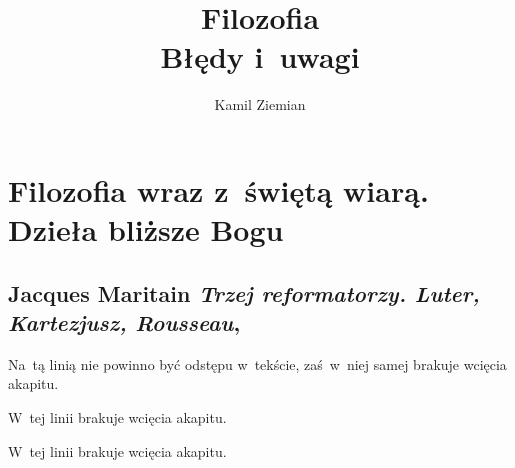 \documentclass[a4paper,11pt]{article}
\title{Filozofia \\
  {\Large Błędy i~uwagi}}
\author{Kamil Ziemian}
\numberwithin{equation}{section}
\begin{document}





\maketitle





\section{Filozofia wraz z~świętą wiarą. Dzieła bliższe Bogu}




\subsection{Jacques Maritain
  \textit{Trzej reformatorzy. Luter, Kartezjusz, Rousseau},
  \cite{MaritainTrzejReformatorzy2005}}


\vspace{0em}



\vspace{0em}


\noindent
{} Na~tą linią nie powinno być odstępu w~tekście,
zaś~w~niej samej brakuje wcięcia akapitu.

\VerSpaceFour





\noindent
{} W~tej linii brakuje wcięcia akapitu.

\VerSpaceFour





\noindent
{} W~tej linii brakuje wcięcia akapitu.

\VerSpaceFour
\end{document}
